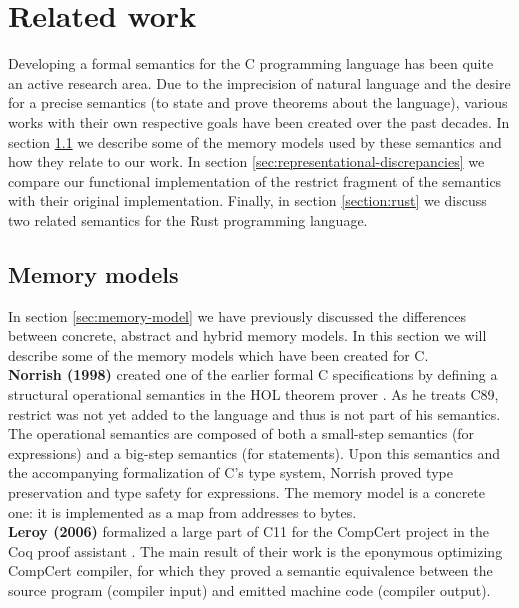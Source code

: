 \chapter{Related work}
Developing a formal semantics for the C programming language has been quite an active research area.
Due to the imprecision of natural language and the desire for a precise semantics (\eg to state and prove theorems about the language),
various works with their own respective goals have been created over the past decades.
In section \ref{sec:related-work} we describe some of the memory models used by these semantics and how they relate to our work.
In section \ref{sec:representational-discrepancies} we compare our functional implementation of the restrict fragment of the \cink{} semantics with their original implementation.
Finally, in section \ref{section:rust} we discuss two related semantics for the Rust programming language.

\section{Memory models}\label{sec:related-work}
In section \ref{sec:memory-model} we have previously discussed the differences between concrete, abstract and hybrid memory models.
In this section we will describe some of the memory models which have been created for C.
\leavevmode \\

\noindent\textbf{Norrish (1998)} created one of the earlier formal C specifications by defining a structural operational semantics in the HOL theorem prover \cite{norrish1998c}.
As he treats C89, restrict was not yet added to the language and thus is not part of his semantics.
The operational semantics are composed of both a small-step semantics (for expressions) and a big-step semantics (for statements).
Upon this semantics and the accompanying formalization of C's type system, Norrish proved type preservation and type safety for expressions. 
The memory model is a concrete one: it is implemented as a map from addresses to bytes.
\leavevmode \\

\noindent\textbf{Leroy \etall (2006)} formalized a large part of C11 for the CompCert project in the Coq proof assistant \cite{leroy2009formal, leroy2016compcert}.
The main result of their work is the eponymous optimizing CompCert compiler, for which they proved a semantic equivalence between the source program (compiler input) and emitted machine code (compiler output).

